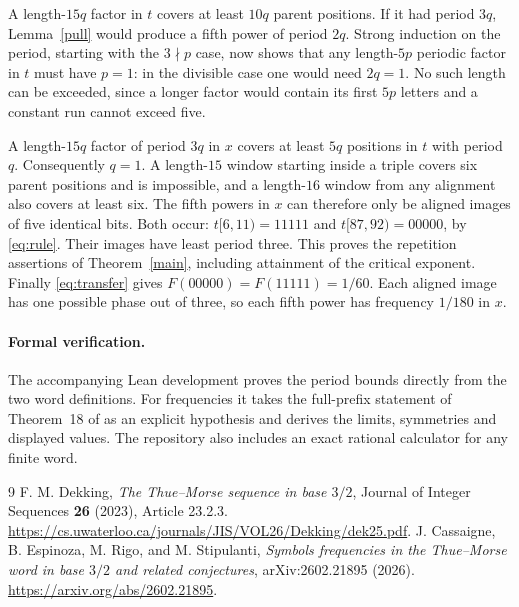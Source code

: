 \documentclass[11pt]{article}
\begin{document}
A length-$15q$ factor in $t$ covers at least $10q$ parent positions. If it had period
$3q$, Lemma~\ref{pull} would produce a fifth power of period $2q$. Strong induction
on the period, starting with the $3\nmid p$ case, now shows that any length-$5p$
periodic factor in $t$ must have $p=1$: in the divisible case one would need $2q=1$.
No such length can be exceeded, since a longer factor would contain its first $5p$
letters and a constant run cannot exceed five.

A length-$15q$ factor of period $3q$ in $x$ covers at least $5q$ positions in $t$
with period $q$. Consequently $q=1$. A length-$15$ window starting inside a triple
covers six parent positions and is impossible, and a length-$16$ window from any
alignment also covers at least six. The fifth powers in $x$ can therefore only be
aligned images of five identical bits. Both occur: $t[6,11)=11111$ and
$t[87,92)=00000$, by \eqref{eq:rule}. Their images have least period three.
This proves the repetition assertions of Theorem~\ref{main}, including attainment of
the critical exponent. Finally \eqref{eq:transfer} gives
$F(00000)=F(11111)=1/60$. Each aligned image has one possible phase out of three,
so each fifth power has frequency $1/180$ in $x$.

\paragraph{Formal verification.}
The accompanying Lean development proves the period bounds directly from the two word
definitions. For frequencies it takes the full-prefix statement of Theorem~18 of
\cite{cers} as an explicit hypothesis and derives the limits, symmetries and displayed
values. The repository also includes an exact rational calculator for any finite word.

\begin{thebibliography}{9}
 F. M. Dekking, \emph{The Thue--Morse sequence in base $3/2$},
Journal of Integer Sequences \textbf{26} (2023), Article 23.2.3.
\url{https://cs.uwaterloo.ca/journals/JIS/VOL26/Dekking/dek25.pdf}.
 J. Cassaigne, B. Espinoza, M. Rigo, and M. Stipulanti,
\emph{Symbols frequencies in the Thue--Morse word in base $3/2$ and related conjectures},
arXiv:2602.21895 (2026). \url{https://arxiv.org/abs/2602.21895}.
\end{thebibliography}
\end{document}
